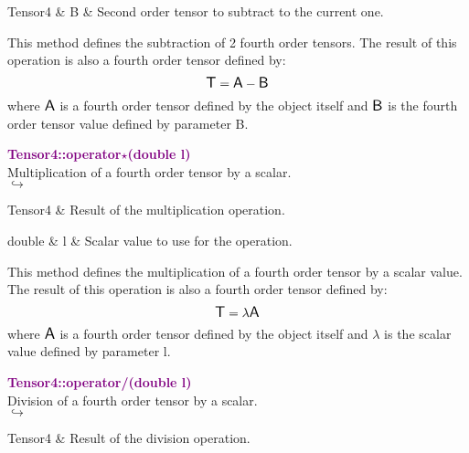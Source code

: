 \begin{tcolorbox}[width=\textwidth,myArgs,tabularx={ll|R}]
Tensor4 & B & Second order tensor to subtract to the current one.
\end{tcolorbox}

This method defines the subtraction of 2 fourth order tensors.
The result of this operation is also a fourth order tensor defined by:
\begin{equation*}
\mbox{\large\ensuremath{\mathsf{T}}} = \mbox{\large\ensuremath{\mathsf{A}}} - \mbox{\large\ensuremath{\mathsf{B}}}
\end{equation*}
where $\mbox{\large\ensuremath{\mathsf{A}}}$ is a fourth order tensor defined by the object itself and $\mbox{\large\ensuremath{\mathsf{B}}}$ is the fourth order tensor value defined by parameter B.

\textcolor{purple}{\textbf{Tensor4::operator$\star$(double l)}}\label{Tensor4::operator*(double l)}\\
Multiplication of a fourth order tensor by a scalar.\\ \hspace*{5mm}$\hookrightarrow$
\vspace*{-2em}\begin{tcolorbox}[grow to left by=-1cm, width=\textwidth-1cm,myArgs,tabularx={l|R}]
Tensor4 & Result of the multiplication operation.
\end{tcolorbox}

\begin{tcolorbox}[width=\textwidth,myArgs,tabularx={ll|R}]
double & l & Scalar value to use for the operation.
\end{tcolorbox}

This method defines the multiplication of a fourth order tensor by a scalar value.
The result of this operation is also a fourth order tensor defined by:
\begin{equation*}
\mbox{\large\ensuremath{\mathsf{T}}} = \lambda \mbox{\large\ensuremath{\mathsf{A}}}
\end{equation*}
where $\mbox{\large\ensuremath{\mathsf{A}}}$ is a fourth order tensor defined by the object itself and $\lambda$ is the scalar value defined by parameter l.

\textcolor{purple}{\textbf{Tensor4::operator/(double l)}}\label{Tensor4::operator/(double l)}\\
Division of a fourth order tensor by a scalar.\\ \hspace*{5mm}$\hookrightarrow$
\vspace*{-2em}\begin{tcolorbox}[grow to left by=-1cm, width=\textwidth-1cm,myArgs,tabularx={l|R}]
Tensor4 & Result of the division operation.
\end{tcolorbox}

